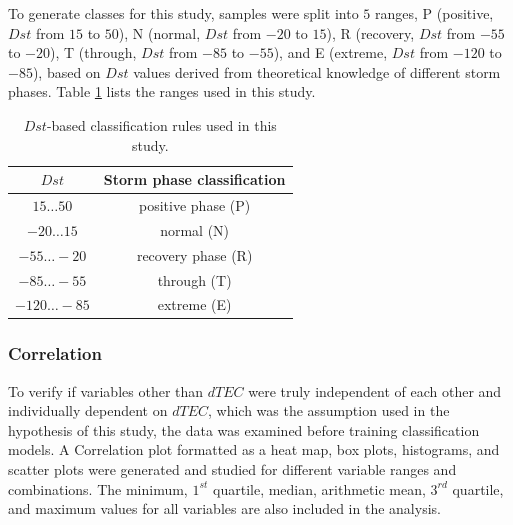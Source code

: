 \documentclass[sn-mathphys-num]{sn-jnl}%
\begin{document}
To generate classes for this study, samples were split into $5$ ranges, P (positive, $Dst$ from $15$ to $50$), N (normal, $Dst$ from $-20$ to $15$), R (recovery, $Dst$ from $-55$ to $-20$), T (through, $Dst$ from $-85$ to $-55$), and E (extreme, $Dst$ from $-120$ to $-85$), based on $Dst$ values derived from theoretical knowledge of different storm phases. Table \ref{tab:Dstranges} lists the ranges used in this study.

\begin{table}[!ht]
    \centering
    \caption{$Dst$-based classification rules used in this study.}
    \label{tab:Dstranges}
    \begin{tabular}{|c|c|}
        \hline
        $Dst$ & Storm phase classification \\ \hline
        $15\dots50$ & positive phase (P) \\ \hline
        $-20\dots15$ & normal (N) \\ \hline
        $-55\dots-20$ & recovery phase (R) \\ \hline
        $-85\dots-55$ & through (T) \\ \hline
        $-120\dots-85$ & extreme (E) \\ \hline
    \end{tabular}
\end{table}

\subsubsection{Correlation}

To verify if variables other than $dTEC$ were truly independent of each other and individually dependent on $dTEC$, which was the assumption used in the hypothesis of this study, the data was examined before training classification models. A Correlation plot formatted as a heat map, box plots, histograms, and scatter plots were generated and studied for different variable ranges and combinations. The minimum, $1^{st}$ quartile, median, arithmetic mean, $3^{rd}$ quartile, and maximum values for all variables are also included in the analysis.
\end{document}
